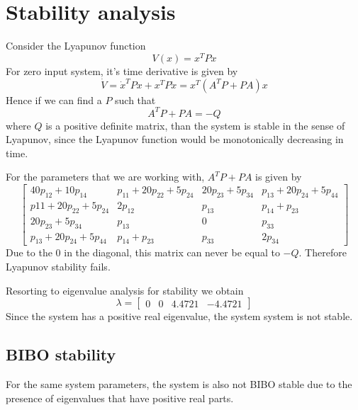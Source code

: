 \documentclass[12pt]{article}
\numberwithin{equation}{section}
\begin{document}
\section{Stability analysis}

Consider the Lyapunov function
\begin{equation}
    V(x) = x^T P x
\end{equation}
For zero input system, it's time derivative is given by
\begin{equation}
    \dot{V} = \dot{x}^T P x + x^T P \dot{x} = x^T (A^T P + P A) x
\end{equation}
Hence if we can find a $P$ such that
\begin{equation}
    A^T P + P A = - Q
\end{equation}
where $Q$ is a positive definite matrix, than the system is stable in the sense of Lyapunov, since the Lyapunov function would be monotonically decreasing in time.

For the parameters that we are working with, $A^T P + P A$ is given by
\begin{equation}
    \begin{bmatrix}
        40 p_{12} + 10 p_{14} & p_{11} + 20 p_{22} + 5 p_{24} & 20 p_{23} + 5 p_{34} & p_{13} + 20 p_{24} + 5 p_{44}\\
        p11 + 20 p_{22} + 5 p_{24} & 2 p_{12} & p_{13} & p_{14} + p_{23}\\
        20 p_{23} + 5 p_{34} & p_{13} & 0 & p_{33}\\
        p_{13} + 20 p_{24} + 5 p_{44} & p_{14} + p_{23} & p_{33} & 2 p_{34}
    \end{bmatrix}
\end{equation}
Due to the 0 in the diagonal, this matrix can never be equal to $-Q$. Therefore Lyapunov stability fails.

Resorting to eigenvalue analysis for stability we obtain
\begin{equation}
    \lambda 
    =
    \begin{bmatrix}
        0 & 0 & 4.4721  & - 4.4721
    \end{bmatrix}
\end{equation}
Since the system has a positive real eigenvalue, the system system is not stable.

\subsection{BIBO stability}

For the same system parameters, the system is also not BIBO stable due to the presence of eigenvalues that have positive real parts.
\end{document}
